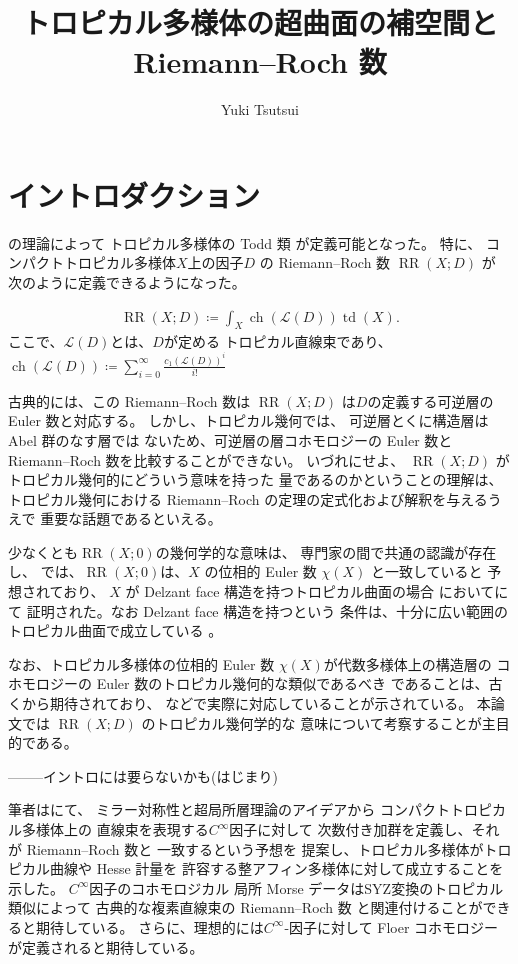 \documentclass[a4paper,dvipdfmx,reqno,12pt]{amsart}
\title{トロピカル多様体の超曲面の補空間と Riemann--Roch 数}
\author[Y. Tsutsui]{Yuki Tsutsui}
\theoremstyle{definition}
\newcommand{\deq}{\coloneqq}
\newcommand{\opn}[1]{\operatorname{#1}}
\numberwithin{equation}{section}
\begin{document}
\maketitle

\section{イントロダクション}

\cite{demedrano2023chern}の理論によって
トロピカル多様体の Todd 類 が定義可能となった。
特に、
コンパクトトロピカル多様体$X$上の因子$D$ の
Riemann--Roch 数 $\opn{RR}(X;D)$ が
次のように定義できるようになった。

\begin{align}
     \opn{RR}(X;D)\deq \int_{X}\opn{ch}(\mathcal{L}(D))\opn{td}(X).
\end{align}
ここで、$\mathcal{L}(D)$とは、$D$が定める
トロピカル直線束であり、
$\opn{ch}(\mathcal{L}(D))\deq 
\sum_{i=0}^{\infty}\frac{c_1(\mathcal{L}(D))^{i}}{i!}$

古典的には、この Riemann--Roch 数は $\opn{RR}(X;D)$
は$D$の定義する可逆層の Euler 数と対応する。
しかし、トロピカル幾何では、
可逆層とくに構造層は Abel 群のなす層では
ないため、可逆層の層コホモロジーの Euler 数と
Riemann--Roch 数を比較することができない。
いづれにせよ、
$\opn{RR}(X;D)$ がトロピカル幾何的にどういう意味を持った
量であるのかということの理解は、
トロピカル幾何における
Riemann--Roch の定理の定式化および解釈を与えるうえで
重要な話題であるといえる。

少なくとも$\opn{RR}(X;0)$の幾何学的な意味は、
専門家の間で共通の認識が存在し、
\cite[Conjecture 6.13]{demedrano2023chern}
では、$\opn{RR}(X;0)$は、$X$
の位相的 Euler 数 $\chi(X)$ と一致していると
予想されており、
$X$ が Delzant face 構造を持つトロピカル曲面の場合
において\cite[Theorem 6.3]{demedrano2023chern}にて
証明された。なお Delzant face 構造を持つという
条件は、十分に広い範囲のトロピカル曲面で成立している
\cite[Corollary 6.11]{demedrano2023chern}。

なお、トロピカル多様体の位相的 Euler 数
$\chi(X)$が代数多様体上の構造層の
コホモロジーの Euler 数のトロピカル幾何的な類似であるべき
であることは、古くから期待されており、
\cite[Corollary 2]{MR3961331}
などで実際に対応していることが示されている。
本論文では $\opn{RR}(X;D)$ のトロピカル幾何学的な
意味について考察することが主目的である。

--------イントロには要らないかも(はじまり)

筆者は\cite{tsutsui2023graded}にて、
ミラー対称性と超局所層理論のアイデアから
コンパクトトロピカル多様体上の
直線束を表現する$C^{\infty}$因子に対して
次数付き加群を定義し、それが Riemann--Roch 数と
一致するという予想\cite[Conjecture 1.2]{tsutsui2023graded}を
提案し、トロピカル多様体がトロピカル曲線や Hesse 計量を
許容する整アフィン多様体に対して成立することを示した。
$C^{\infty}$因子のコホモロジカル
局所 Morse データはSYZ変換のトロピカル類似によって
古典的な複素直線束の Riemann--Roch 数
と関連付けることができると期待している。
さらに、理想的には$C^{\infty}$-因子に対して
Floer コホモロジーが定義されると期待している。
\end{document}
